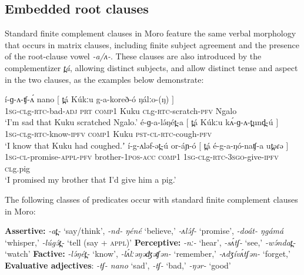 \subsection{Embedded root clauses}\label{sec:ch15:rtc}

Standard finite complement clauses in Moro feature the same verbal morphology that occurs in matrix clauses, including finite subject agreement and the presence of the root-clause vowel \textit{-a/ʌ-}. These clauses are also introduced by the complementizer \textit{t̪á}, allowing distinct subjects, and allow distinct tense and aspect in the two clauses, as the examples below demonstrate:

\ea  \gll 		í-ɡ-ʌ-ʧ-ʌ́		nano	 			$[$	t̪á		Kúkːu 	g-{a}-koreð-ó		 ŋálːo-(ŋ) $]$\\
		\textsc{1sg}-\textsc{cl}g-\textsc{rtc}-bad-\textsc{adj}	\textsc{prt} {}	 \textsc{comp1}	 Kuku		\textsc{cl}g-\textsc{rtc}-scratch-\textsc{pfv} Ngalo	{}\\
	\glt‘I’m sad that Kuku scratched Ngalo.’
\ex \gll 		é-ɡ-a-lə́ŋét̪-a					$[$	t̪á	Kúkːu kʌ́-ɡ-{ʌ}-t̪und̪-ú  $]$\\
		\textsc{1sg}-\textsc{cl}g-\textsc{rtc}-know-\textsc{ipfv}	{} \textsc{comp1} Kuku	\textsc{pst}-\textsc{cl}-\textsc{rtc}-cough-\textsc{pfv} {}\\
		\glt ‘I know that Kuku had coughed.ʼ \label{src1}
\ex \gll  í-g-ʌləf-ət̪-ú                           or-áɲ-ó          $[$             	 t̪á 	é-g-{a}-ŋó-naʧ-a                          ut̪əɾə   $]$\\
\textsc{1sg}-\textsc{cl}-promise-\textsc{appl}-\textsc{pfv}  brother-\textsc{1pos}-\textsc{acc} {} \textsc{comp1} \textsc{1sg-cl}g-\textsc{rtc-3sgo}-give-\textsc{ipfv}  \textsc{cl}g.pig {}\\
\glt `I promised my brother that I’d give him a pig.'
\z 

The following classes of predicates occur with standard finite complement clauses in Moro:

\ea 
\ea  \textbf{Assertive:} \textit{-at̪-} `say/think', \textit{-nd- ŋéné} `believe,' \textit{-ʌlə́f-} `promise', \textit{-doát- ŋgámá} `whisper,'  \textit{-lúgə́t̪-} `tell (say + \textsc{appl})'
\ex  \textbf{Perceptive:} \textit{-nː-} `hear', \textit{-sʌ́tʃ-} `see,' \textit{-wə́ndat̪-} `watch'
\ex  \textbf{Factive:} \textit{-lə́ŋét̪-} `know', \textit{-lʌ́lːəŋəʤəʧən-} `remember,' \textit{-ʌdʒívʌ́tʃən-} `forget,' 
\ex  \textbf{Evaluative adjectives}: \textit{-tʃ- nano} `sad', \textit{-tʃ-} `bad,' \textit{-ŋər-} `good'
\z 
\z 

